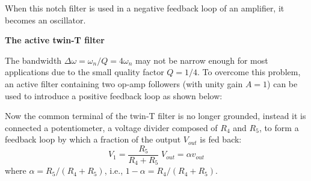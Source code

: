 \documentclass{article}
\begin{document}
\begin{comment}
This result can also be reached by noticing the following
\begin{equation}
H'(j\omega)\big|_{\omega=1/\tau}=\frac{1}{1+j2},\;\;\;\;\;\;\;
H''(j\omega)\big|_{\omega=1/\tau}=\frac{1}{1-j2}
\end{equation}
As they are equal in magnitude but opposite in phase, their outputs 
cancel each other to produce zero output.
\end{comment}

When this notch filter is used in a negative feedback loop of an 
amplifier, it becomes an oscillator.


{\bf The active twin-T filter}

The bandwidth $\Delta\omega=\omega_n/Q=4\omega_n$ may not be narrow
enough for most applications due to the small quality factor $Q=1/4$. 
To overcome this problem, an active filter containing two op-amp 
followers (with unity gain $A=1$) can be used to introduce a positive
feedback loop as shown below:


Now the common terminal of the twin-T filter is no longer grounded, 
instead it is connected a potentiometer, a voltage divider composed 
of $R_4$ and $R_5$, to form a feedback loop by which a fraction of the
output $V_{out}$ is fed back:
\begin{equation}
V_1=\frac{R_5}{R_4+R_5}\;V_{out}=\alpha v_{out}
\end{equation}
where $\alpha=R_5/(R_4+R_5)$, i.e., $1-\alpha=R_4/(R_4+R_5)$.

\end{document}
